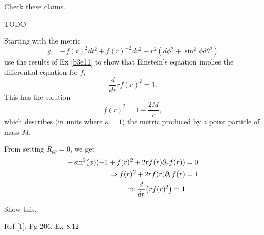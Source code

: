 \documentclass[10pt]{article}
\begin{document}
\begin{example}
	Check these claims.
\end{example}
\sol TODO


\begin{example}
	Starting with the metric
	$$
	g=-f(r)^2dt^2+f(r)^{-2}dr^2+r^2(d\phi^2+\sin^2\phi d\theta^2)
	$$
	use the results of Ex \ref{b3e11} to show that Einstein's equation implies the differential equation for $f$,
	$$
	\frac{d}{dr}rf(r)^2=1.
	$$
	This has the solution
	$$
	f(r)^2=1-\frac{2M}{r},
	$$
	which describes (in units where $\kappa=1$) the metric produced by a point particle of mass $M$.
\end{example}
\sol From setting $R_{\theta\theta} = 0$, we get
$$
\begin{aligned}
	-\sin^2(\phi)(-1+f(r)^2+2rf(r)\partial_rf(r))&=0\\
	\Rightarrow f(r)^2+2rf(r)\partial_rf(r)&=1\\
	\Rightarrow \frac{d}{dr}\p*{rf(r)^2}=1
\end{aligned}
$$


\begin{example}\label{b3e21}
	Show this.
\end{example}
\sol Ref [1], Pg 206, Ex 8.12
\end{document}
